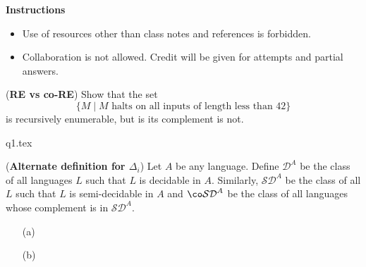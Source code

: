 \documentclass[12pt, a4paper,answers]{exam}
\renewcommand{\D}{\mathcal{D}}
\newcommand{\SD}{\mathcal{SD}}
\begin{document}
\textbf{Instructions}
\begin{itemize}   \setlength\itemsep{0.1mm}
	\item {\sf  Use of resources other than class notes and references is forbidden.}
	\item {\sf Collaboration is not allowed. Credit will be given for attempts and partial answers.}
\end{itemize}


\begin{questions}

\question[10] (\textbf{RE vs co-RE}) Show that the set \[ \{M \mid M \text{ halts on all inputs of length less than $42$}\}\] is recursively enumerable, but is its complement is not.

\begin{solution}
	{q1.tex}
\end{solution}

	\question[10] (\textbf{Alternate definition for $\Delta_i$}) Let $A$ be any language. Define $\D^A$ be the class of all languages $L$ such that $L$ is decidable in $A$. Similarly, $\SD^A$ be the class of all $L$ such that $L$ is semi-decidable in $A$ and $\co\SD^A $ be the class of all languages whose complement is in $\SD^A$.
	

\begin{solution}
	\begin{enumerate}
		\item[(a)] 
		\item[(b)] 
	\end{enumerate}
\end{solution}



\end{questions}
\end{document}
